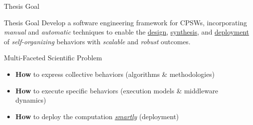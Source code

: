\documentclass[presentation, 8pt,169]{beamer}\mode<presentation>{\usetheme{AMSBolognaFC}}
\begin{document}
\begin{frame}{Thesis Goal}
  \begin{alertblock}{Thesis Goal}
    Develop a software engineering framework for CPSWs, 
    incorporating \emph{manual} and \emph{automatic} techniques to enable the \underline{design}, \underline{synthesis}, and \underline{deployment} of \emph{self-organizing} behaviors with \emph{scalable} and \emph{robust} outcomes.
  \end{alertblock}

  \begin{exampleblock}{Multi-Faceted Scientific Problem}
    \begin{itemize}
      \item \textbf{How} to express collective behaviors (algorithms \& methodologies)
      \item \textbf{How} to execute specific behaviors (execution models \& middleware dynamics)
      \item \textbf{How} to deploy the computation \emph{\underline{smartly}} (deployment) 
    \end{itemize}
  \end{exampleblock}
\end{frame}
\end{document}
